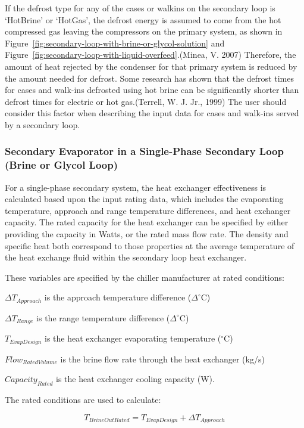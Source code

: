 If the defrost type for any of the cases or walkins on the secondary loop is `HotBrine' or `HotGas', the defrost energy is assumed to come from the hot compressed gas leaving the compressors on the primary system, as shown in Figure~\ref{fig:secondary-loop-with-brine-or-glycol-solution} and Figure~\ref{fig:secondary-loop-with-liquid-overfeed}.(Minea, V. 2007) Therefore, the amount of heat rejected by the condenser for that primary system is reduced by the amount needed for defrost. Some research has shown that the defrost times for cases and walk-ins defrosted using hot brine can be significantly shorter than defrost times for electric or hot gas.(Terrell, W. J. Jr., 1999) The user should consider this factor when describing the input data for cases and walk-ins served by a secondary loop.

\subsubsection{Secondary Evaporator in a Single-Phase Secondary Loop (Brine or Glycol Loop)}\label{secondary-evaporator-in-a-single-phase-secondary-loop-brine-or-glycol-loop}

For a single-phase secondary system, the heat exchanger effectiveness is calculated based upon the input rating data, which includes the evaporating temperature, approach and range temperature differences, and heat exchanger capacity. The rated capacity for the heat exchanger can be specified by either providing the capacity in Watts, or the rated mass flow rate. The density and specific heat both correspond to those properties at the average temperature of the heat exchange fluid within the secondary loop heat exchanger.

These variables are specified by the chiller manufacturer at rated conditions:

\(\Delta T_{Approach}\) is the approach temperature difference (\(\Delta^{\circ}\)C)

\(\Delta T_{Range}\) is the range temperature difference (\(\Delta^{\circ}\)C)

\(T_{EvapDesign}\) is the heat exchanger evaporating temperature (\(^{\circ}\)C)

\(Flow_{RatedVolume}\) is the brine flow rate through the heat exchanger (kg/s)

\(Capacity_{Rated}\) is the heat exchanger cooling capacity (W).

The rated conditions are used to calculate:

\begin{equation}
T_{BrineOutRated} = T_{EvapDesign} + \Delta T_{Approach}
\end{equation}

